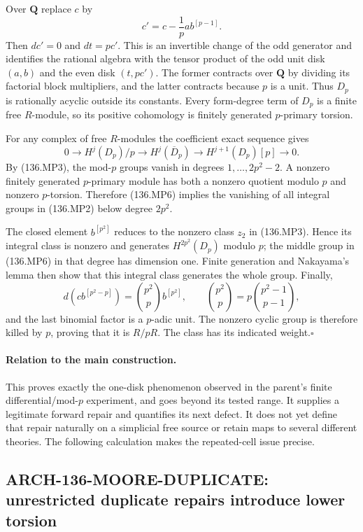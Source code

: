 Over $\mathbf Q$ replace $c$ by
\[
                         c'=c-\frac1p a b^{[p-1]}.
\]
Then $dc'=0$ and $dt=pc'$.  This is an invertible change of the
odd generator and identifies the rational algebra with the tensor
product of the odd unit disk $(a,b)$ and the even disk $(t,pc')$.
The former contracts over $\mathbf Q$ by dividing its factorial
block multipliers, and the latter contracts because $p$ is a unit.
Thus $D_p$ is rationally acyclic outside its constants.
Every form-degree term of $D_p$ is a finite free $R$-module, so
its positive cohomology is finitely generated $p$-primary torsion.

For any complex of free $R$-modules the coefficient exact sequence
gives
\[
 0\to H^j(D_p)/p\to H^j(\overline D_p)
                   \to H^{j+1}(D_p)[p]\to0.              \tag{136.MP6}
\]
By (136.MP3), the mod-$p$ groups vanish in degrees
$1,\ldots,2p^2-2$.  A nonzero finitely generated $p$-primary
module has both a nonzero quotient modulo $p$ and nonzero
$p$-torsion.  Therefore (136.MP6) implies the vanishing of all
integral groups in (136.MP2) below degree $2p^2$.

The closed element $b^{[p^2]}$ reduces to the nonzero class $z_2$
in (136.MP3).  Hence its integral class is nonzero and generates
$H^{2p^2}(D_p)$ modulo $p$; the middle group in (136.MP6) in that
degree has dimension one.  Finite generation and Nakayama's lemma
then show that this integral class generates the whole group.
Finally,
\[
 d(c b^{[p^2-p]})
       =\binom{p^2}{p}b^{[p^2]},\qquad
 \binom{p^2}{p}=p\binom{p^2-1}{p-1},                     \tag{136.MP7}
\]
and the last binomial factor is a $p$-adic unit.  The nonzero
cyclic group is therefore killed by $p$, proving that it is $R/pR$.
The class has its indicated weight.\hfill$\square$

\paragraph{Relation to the main construction.}
This proves exactly the one-disk phenomenon observed in the parent's
finite differential/mod-$p$ experiment, and goes beyond its tested
range.  It supplies a legitimate forward repair and quantifies its
next defect.  It does not yet define that repair naturally on a
simplicial free source or retain maps to several different theories.
The following calculation makes the repeated-cell issue precise.

\subsection{ARCH-136-MOORE-DUPLICATE: unrestricted duplicate repairs introduce lower torsion}

